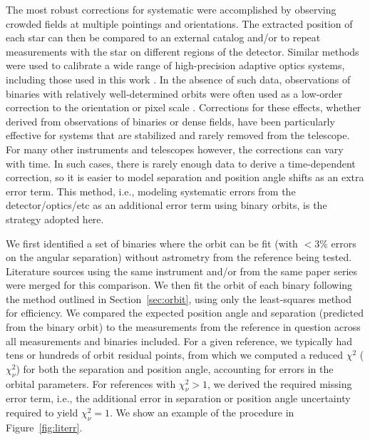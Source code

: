 \documentclass[twocolumn]{aastex62}
\begin{document}
The most robust corrections for systematic were accomplished by observing crowded fields at multiple pointings and orientations. The extracted position of each star can then be compared to an external catalog and/or to repeat measurements with the star on different regions of the detector. Similar methods were used to calibrate a wide range of high-precision adaptive optics systems, including those used in this work \citep{Yelda2010, 2016PASP..128i5004S, 2015MNRAS.453.3234P}. In the absence of such data, observations of binaries with relatively well-determined orbits were often used as a low-order correction to the orientation or pixel scale \citep[e.g.,][]{Tok2015c}. Corrections for these effects, whether derived from observations of binaries or dense fields, have been particularly effective for systems that are stabilized and rarely removed from the telescope. For many other instruments and telescopes however, the corrections can vary with time. In such cases, there is rarely enough data to derive a time-dependent correction, so it is easier to model separation and position angle shifts as an extra error term. This method, i.e., modeling systematic errors from the detector/optics/etc as an additional error term using binary orbits, is the strategy  adopted here.

We first identified a set of binaries where the orbit can be fit (with $<3\%$ errors on the angular separation) without astrometry from the reference being tested. Literature sources using the same instrument and/or from the same paper series were merged for this comparison. We then fit the orbit of each binary following the method outlined in Section~\ref{sec:orbit}, using only the least-squares method for efficiency. We compared the expected position angle and separation (predicted from the binary orbit) to the measurements from the reference in question across all measurements and binaries included. For a given reference, we typically had tens or hundreds of orbit residual points, from which we computed a reduced $\chi^2$ ($\chi^2_\nu$) for both the separation and position angle, accounting for errors in the orbital parameters. For references with $\chi^2_\nu > 1$, we derived the required missing error term, i.e., the additional error in separation or position angle uncertainty required to yield $\chi^2_\nu = 1$. We show an example of the procedure in Figure~\ref{fig:literr}. 
\end{document}
